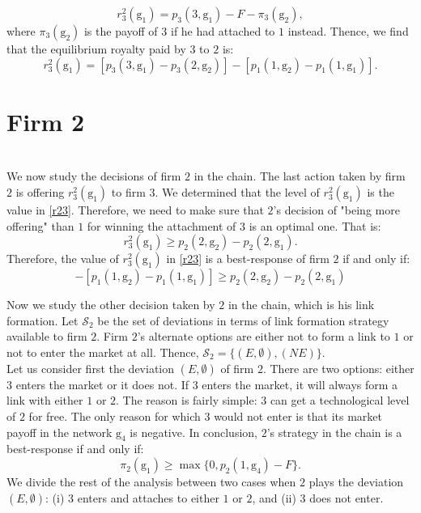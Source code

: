 \documentclass{article}
\begin{document}
\begin{equation*}
    r^2_3(\text{g}_1)= p_3(3,\text{g}_1)-F-\pi_3(\text{g}_2), 
\end{equation*}
where $\pi_3(\text{g}_2)$ is the payoff of $3$ if he had attached to $1$ instead. Thence, we find that the equilibrium royalty paid by $3$ to $2$ is: 
\begin{equation}
    r^2_3(\text{g}_1)=[ p_3(3,\text{g}_1)-p_3(2,\text{g}_2)]-[p_1(1,\text{g}_2)-p_1(1,\text{g}_1)]. \label{r23}
\end{equation}


\indent \chapter{\textbf{Firm 2}}\\
We now study the decisions of firm $2$ in the chain. The last action taken by firm $2$ is offering $r^2_3(\text{g}_1)$ to firm $3$. We determined that the level of $r^2_3(\text{g}_1)$ is the value in \eqref{r23}. Therefore, we need to make sure that $2$'s decision of "being more offering" than $1$ for winning the attachment of $3$ is an optimal one. That is: 
\begin{equation*}
    r^2_3(\text{g}_1)\geq p_2(2,\text{g}_2)-p_2(2,\text{g}_1).
\end{equation*}
Therefore, the value of $r^2_3(\text{g}_1)$ in \eqref{r23} is a best-response of firm $2$ if and only if: 
\begin{equation}
   [ p_3(3,\text{g}_1)-p_3(2,\text{g}_2)]-[p_1(1,\text{g}_2)-p_1(1,\text{g}_1)]\geq p_2(2,\text{g}_2)-p_2(2,\text{g}_1) 
\end{equation}

Now we study the other decision taken by $2$ in the chain, which is his link formation. Let $\mathcal{S}_2$ be the set of deviations in terms of link formation strategy available to firm $2$. Firm $2$'s alternate options are either not to form a link to $1$ or not to enter the market at all. Thence, $\mathcal{S}_2=\{(E,\emptyset), (NE)\}$.  \\ 
Let us consider first the deviation $(E,\emptyset)$ of firm $2$. There are two options: either $3$ enters the market or it does not. If $3$ enters the market, it will always form a link with either $1$ or $2$. The reason is fairly simple: $3$ can get a technological level of $2$ for free. The only reason for which $3$ would not enter is that its market payoff in the network $\text{g}_4$ is negative. In conclusion, $2$'s strategy in the chain is a best-response if and only if: 
\begin{equation*}
    \pi_2(\text{g}_1)\geq \max\{0, p_2(1,\text{g}_4)-F\}.
\end{equation*}
We divide the rest of the analysis between two cases when $2$ plays the deviation $(E,\emptyset)$: (i) $3$ enters and attaches to either $1$ or $2$, and (ii) $3$ does not enter. \\
\end{document}
